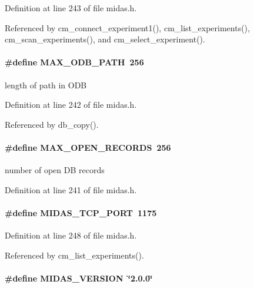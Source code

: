 Definition at line 243 of file midas.h.

Referenced by cm\_\-connect\_\-experiment1(), cm\_\-list\_\-experiments(), cm\_\-scan\_\-experiments(), and cm\_\-select\_\-experiment().
\paragraph[{MAX\_\-ODB\_\-PATH}]{\setlength{\rightskip}{0pt plus 5cm}\#define MAX\_\-ODB\_\-PATH~256}\hfill\label{group__midasincludecode_ga78b086c08dd57c930e2997a71a3ae5ee}
length of path in ODB 

Definition at line 242 of file midas.h.

Referenced by db\_\-copy().
\paragraph[{MAX\_\-OPEN\_\-RECORDS}]{\setlength{\rightskip}{0pt plus 5cm}\#define MAX\_\-OPEN\_\-RECORDS~256}\hfill\label{group__midasincludecode_gaa5445fb29f607c9bfac3cd36efd40cc1}
number of open DB records 

Definition at line 241 of file midas.h.
\paragraph[{MIDAS\_\-TCP\_\-PORT}]{\setlength{\rightskip}{0pt plus 5cm}\#define MIDAS\_\-TCP\_\-PORT~1175}\hfill\label{group__midasincludecode_ga5e0ae79a5bfdb2f6fc9840d149d702a5}


Definition at line 248 of file midas.h.

Referenced by cm\_\-list\_\-experiments().
\paragraph[{MIDAS\_\-VERSION}]{\setlength{\rightskip}{0pt plus 5cm}\#define MIDAS\_\-VERSION~\char`\"{}2.0.0\char`\"{}}\hfill\label{group__midasincludecode_ga8486b1a99e82fc5138d53b01bdcf405e}


